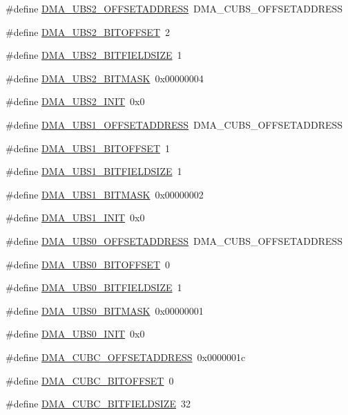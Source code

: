 \begin{DoxyCompactItemize}
\item 
\#define \hyperlink{a00547_a58a43cfc475c82cce863a3d389ec247b}{DMA\_\-UBS2\_\-OFFSETADDRESS}~DMA\_\-CUBS\_\-OFFSETADDRESS
\item 
\#define \hyperlink{a00547_a39c705909c5c5b581e63d83bb178d940}{DMA\_\-UBS2\_\-BITOFFSET}~2
\item 
\#define \hyperlink{a00547_a9f255ee2eb710d462fc908f1c43634b7}{DMA\_\-UBS2\_\-BITFIELDSIZE}~1
\item 
\#define \hyperlink{a00547_a1b78974148ef350a161c3b9197f213e2}{DMA\_\-UBS2\_\-BITMASK}~0x00000004
\item 
\#define \hyperlink{a00547_ab54c7aead38fa343411178576e1e82dc}{DMA\_\-UBS2\_\-INIT}~0x0
\item 
\#define \hyperlink{a00547_aecf79555d74ae18894265e76340d9512}{DMA\_\-UBS1\_\-OFFSETADDRESS}~DMA\_\-CUBS\_\-OFFSETADDRESS
\item 
\#define \hyperlink{a00547_a46105c7a3f7eef51b62bc01ab43dc1e0}{DMA\_\-UBS1\_\-BITOFFSET}~1
\item 
\#define \hyperlink{a00547_ad8b65d19365227f764e3906c72f7a96b}{DMA\_\-UBS1\_\-BITFIELDSIZE}~1
\item 
\#define \hyperlink{a00547_a6464b961077ef5a80528065aca28c708}{DMA\_\-UBS1\_\-BITMASK}~0x00000002
\item 
\#define \hyperlink{a00547_a6bfc4dcd01d578ce62d107a0b62ef746}{DMA\_\-UBS1\_\-INIT}~0x0
\item 
\#define \hyperlink{a00547_a3fcb52ea5762aec6e08d9402b01d0f32}{DMA\_\-UBS0\_\-OFFSETADDRESS}~DMA\_\-CUBS\_\-OFFSETADDRESS
\item 
\#define \hyperlink{a00547_ad1f484910de0d7511f11eae9c6ea26b1}{DMA\_\-UBS0\_\-BITOFFSET}~0
\item 
\#define \hyperlink{a00547_a8042a05749b9a48b9d1297b6f18421b0}{DMA\_\-UBS0\_\-BITFIELDSIZE}~1
\item 
\#define \hyperlink{a00547_ae8bde4517976f8b9a435695635769a2b}{DMA\_\-UBS0\_\-BITMASK}~0x00000001
\item 
\#define \hyperlink{a00547_ab4b7b4598f9c3fec92c514fae4e89c02}{DMA\_\-UBS0\_\-INIT}~0x0
\item 
\#define \hyperlink{a00547_ad058d6e38845a244f2613c7f06e75468}{DMA\_\-CUBC\_\-OFFSETADDRESS}~0x0000001c
\item 
\#define \hyperlink{a00547_a8c931af4b32c78702551037d3a575726}{DMA\_\-CUBC\_\-BITOFFSET}~0
\item 
\#define \hyperlink{a00547_adb6f5ea392a7d8e8a6554096eed8fd81}{DMA\_\-CUBC\_\-BITFIELDSIZE}~32
\item 

\end{DoxyCompactItemize}
